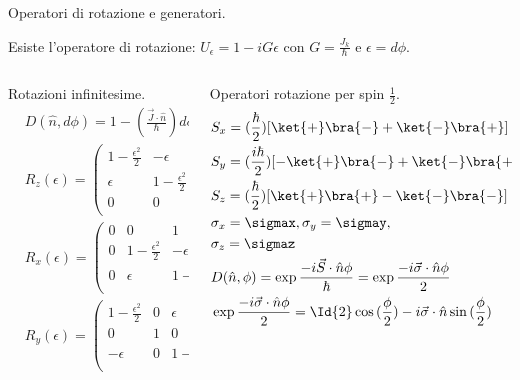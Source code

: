 \begin{frame}{ Operatori di rotazione e generatori.}
     
Esiste l'operatore di rotazione: $U_{\epsilon}=1-iG\epsilon$ con $G=\frac{J_k}{\hbar}$ e $\epsilon=d\phi$.

\begin{columns}[T]
\begin{column}{0.4\textwidth}
\begin{block}{Rotazioni infinitesime.}
\begin{align*}
&D(\hat{n},d\phi)=1-(\frac{\vec{J}\cdot\hat{n}}{\hbar})d\phi\\
&R_z(\epsilon)=\begin{pmatrix}1-\frac{\epsilon^2}{2}&-\epsilon&0\\\epsilon&1-\frac{\epsilon^2}{2}&0\\0&0&1\\\end{pmatrix}\\
&R_x(\epsilon)=\begin{pmatrix}0&0&1\\0&1-\frac{\epsilon^2}{2}&-\epsilon\\0&\epsilon&1-\frac{\epsilon^2}{2}\\\end{pmatrix}\\
&R_y(\epsilon)=\begin{pmatrix}1-\frac{\epsilon^2}{2}&0&\epsilon\\0&1&0\\-\epsilon&0&1-\frac{\epsilon^2}{2}\\\end{pmatrix}
\end{align*}
\end{block}
\end{column}
\begin{column}{0.6\textwidth}
\begin{block}{Operatori rotazione per spin $\frac{1}{2}$.}
\begin{align*}
&S_x=(\frac{\hbar}{2})[\ket{+}\bra{-}+\ket{-}\bra{+}]=(\frac{\hbar}{2})\sigma_x\\
&S_y=(\frac{i \hbar}{2})[-\ket{+}\bra{-}+\ket{-}\bra{+}]=(\frac{\hbar}{2})\sigma_y\\
&S_z=(\frac{\hbar}{2})[\ket{+}\bra{+}-\ket{-}\bra{-}]=(\frac{\hbar}{2})\sigma_z\\
&\sigma_x=\sigmax, \sigma_y=\sigmay,\\
&\sigma_z=\sigmaz\\
&D(\hat{n},\phi)=\exp{\frac{-i\vec{S}\cdot\hat{n}\phi}{\hbar}}=\exp{\frac{-i\vec{\sigma}\cdot\hat{n}\phi}{2}}\\
&\exp{\frac{-i\vec{\sigma}\cdot\hat{n}\phi}{2}}=\Id{2}\cos{(\frac{\phi}{2})}-i\vec{\sigma}\cdot\hat{n}\sin{(\frac{\phi}{2})}
\end{align*}
\end{block}
\end{column}
\end{columns}
\end{frame}

